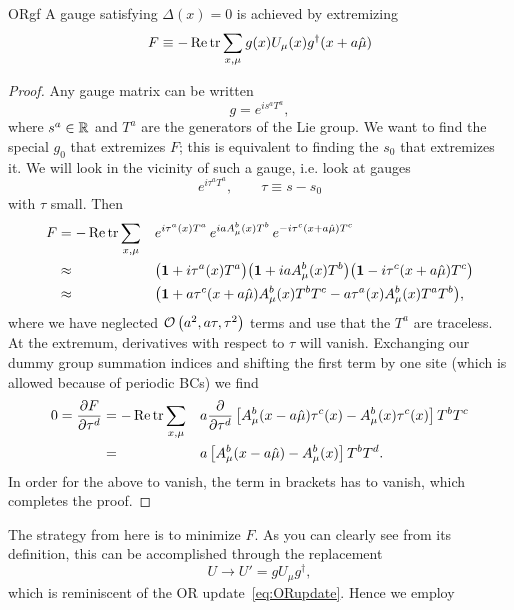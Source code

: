 \begin{proposition}{}{ORgf}
A gauge satisfying $\Delta(x)=0$ is achieved by extremizing
$$
  F\equiv-\mathop{\mathrm{Re}}\tr\sum_{x,\mu} g(x) U_\mu(x) g^\dagger(x+a\hat{\mu})
$$
\begin{proof}
Any gauge matrix can be written
$$
  g=e^{is^aT^a},
$$
where $s^a\in\mathbb{R}$ and $T^a$ are the generators of the Lie group. We want
to find the special $g_0$ that extremizes $F$; this is equivalent to finding
the $s_0$ that extremizes it. We will look in the vicinity of such a
gauge, i.e. look at gauges 
$$e^{i\tau^a T^a}, \qquad\tau\equiv s-s_0$$
with $\tau$ small. Then
\begin{equation*}\begin{aligned}
  F&=-\mathop{\mathrm{Re}}\tr\sum_{x,\mu}&&
      e^{i\tau^a(x)T^a}\,e^{iaA^b_\mu(x)T^b}\,e^{-i\tau^c(x+a\hat\mu)T^c}\\
   &\approx &&\big({\mathbf 1}+i\tau^a(x)T^a\big)
        \big({\mathbf 1}+iaA_\mu^b(x)T^b\big)
        \big({\mathbf 1}-i\tau^c(x+a\hat\mu)T^c\big)\\
   &\approx && \big({\mathbf 1}+a\tau^c(x+a\hat\mu)A_\mu^b(x)T^bT^c
                       -a\tau^a(x)A_\mu^b(x)T^aT^b\big),
\end{aligned}\end{equation*} 
where we have neglected $\operatorname{\mathcal{O}}\left(a^2, a\tau, \tau^2\right)$ terms and use that
the $T^a$ are traceless. At the extremum, derivatives with respect to $\tau$
will vanish. Exchanging our dummy group summation indices and shifting
the first term by one site (which is allowed because of 
periodic BCs) we find
\begin{equation*}\begin{aligned}
  0=\frac{\partial F}{\partial\tau^d}
     &=-\mathop{\mathrm{Re}}\tr\sum_{x,\mu}&&a\frac{\partial}{\partial\tau^d}
        \left[A_\mu^b(x-a\hat\mu)\tau^c(x)-A_\mu^b(x)\tau^c(x)\right]T^bT^c\\
     &= &&a\left[A_\mu^b(x-a\hat\mu)-A_\mu^b(x)\right]T^bT^d.
\end{aligned}\end{equation*}
In order for the above to vanish, the term in brackets has to vanish,
which completes the proof.
\end{proof}
\end{proposition}
The strategy from here is to minimize $F$. As you can clearly see from
its definition, this can be accomplished through the replacement
\begin{equation}\label{eq:gfORupdate}
U\to U'=gU_\mu g^\dagger,
\end{equation}
which is reminiscent of the OR update~\eqref{eq:ORupdate}. Hence we employ
